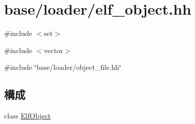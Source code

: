\hypertarget{elf__object_8hh}{
\section{base/loader/elf\_\-object.hh}
\label{elf__object_8hh}
}
{\ttfamily \#include $<$set$>$}\par
{\ttfamily \#include $<$vector$>$}\par
{\ttfamily \#include \char`\"{}base/loader/object\_\-file.hh\char`\"{}}\par
\subsection*{構成}
\begin{DoxyCompactItemize}
\item 
class \hyperlink{classElfObject}{ElfObject}
\end{DoxyCompactItemize}
